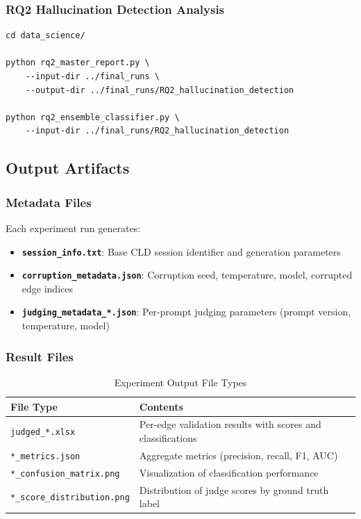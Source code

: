 \subsubsection{RQ2 Hallucination Detection Analysis}

\begin{verbatim}
cd data_science/

python rq2_master_report.py \
    --input-dir ../final_runs \
    --output-dir ../final_runs/RQ2_hallucination_detection

python rq2_ensemble_classifier.py \
    --input-dir ../final_runs/RQ2_hallucination_detection
\end{verbatim}

\subsection{Output Artifacts}
\label{sec:output_artifacts}

\subsubsection{Metadata Files}

Each experiment run generates:
\begin{itemize}[noitemsep]
    \item \textbf{\texttt{session\_info.txt}}: Base CLD session identifier and generation parameters
    \item \textbf{\texttt{corruption\_metadata.json}}: Corruption seed, temperature, model, corrupted edge indices
    \item \textbf{\texttt{judging\_metadata\_*.json}}: Per-prompt judging parameters (prompt version, temperature, model)
\end{itemize}

\subsubsection{Result Files}

\begin{table}[H]
\centering
\caption{Experiment Output File Types}
\label{tab:output_files}
\footnotesize
\begin{tabular}{@{}ll@{}}
\toprule
\textbf{File Type} & \textbf{Contents} \\
\midrule
\texttt{judged\_*.xlsx} & Per-edge validation results with scores and classifications \\
\texttt{*\_metrics.json} & Aggregate metrics (precision, recall, F1, AUC) \\
\texttt{*\_confusion\_matrix.png} & Visualization of classification performance \\
\texttt{*\_score\_distribution.png} & Distribution of judge scores by ground truth label \\
\bottomrule
\end{tabular}
\end{table}

